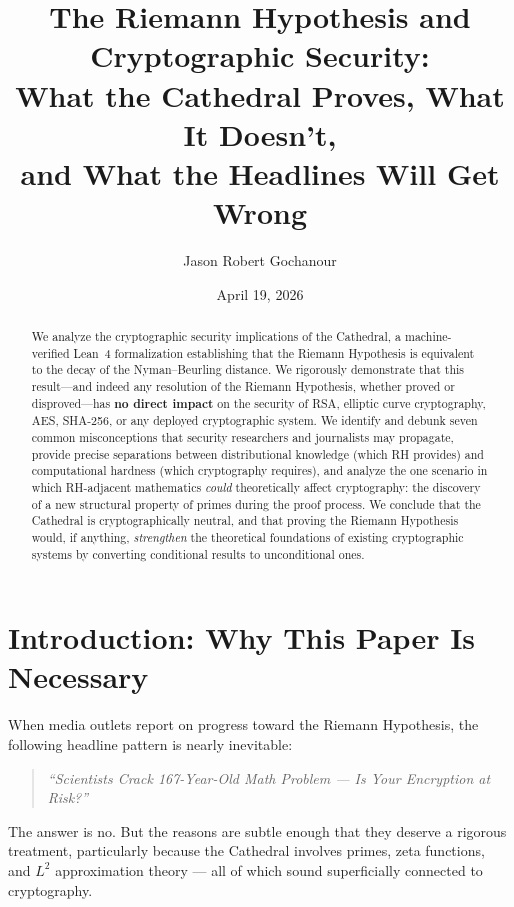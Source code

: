 \documentclass[11pt,a4paper]{article}
\title{%
  The Riemann Hypothesis and Cryptographic Security:\\
  What the Cathedral Proves, What It Doesn't,\\
  and What the Headlines Will Get Wrong%
}
\author{
  Jason Robert Gochanour
}
\date{April 19, 2026}
\theoremstyle{definition}
\theoremstyle{plain}
\begin{document}
\maketitle

\begin{abstract}
We analyze the cryptographic security implications of the Cathedral, a
machine-verified Lean~4 formalization establishing that the Riemann
Hypothesis is equivalent to the decay of the Nyman--Beurling distance.
We rigorously demonstrate that this result---and indeed any resolution
of the Riemann Hypothesis, whether proved or disproved---has
\textbf{no direct impact} on the security of RSA, elliptic curve
cryptography, AES, SHA-256, or any deployed cryptographic system.
We identify and debunk seven common misconceptions that security
researchers and journalists may propagate, provide precise
separations between distributional knowledge (which RH provides) and
computational hardness (which cryptography requires), and analyze
the one scenario in which RH-adjacent mathematics \emph{could}
theoretically affect cryptography: the discovery of a new structural
property of primes during the proof process. We conclude that the
Cathedral is cryptographically neutral, and that proving the Riemann
Hypothesis would, if anything, \emph{strengthen} the theoretical
foundations of existing cryptographic systems by converting
conditional results to unconditional ones.
\end{abstract}

\tableofcontents

\section{Introduction: Why This Paper Is Necessary}

When media outlets report on progress toward the Riemann Hypothesis,
the following headline pattern is nearly inevitable:

\begin{quote}
\emph{``Scientists Crack 167-Year-Old Math Problem --- Is Your
Encryption at Risk?''}
\end{quote}

The answer is no. But the reasons are subtle enough that they deserve
a rigorous treatment, particularly because the Cathedral involves
primes, zeta functions, and $L^2$ approximation theory --- all of
which sound superficially connected to cryptography.
\end{document}

